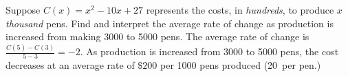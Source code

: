 {Suppose $C(x) = x^2-10x+27$ represents the costs, in \textit{hundreds}, to produce $x$ \textit{thousand} pens.  Find and interpret the average rate of change as production is increased from making 3000 to 5000 pens.}
{The average rate of change is $\frac{C(5)-C(3)}{5-3}=-2$.  As production is increased from 3000 to 5000 pens, the cost decreases at an average rate of  $\$200$ per 1000 pens produced (20\textcent \, per pen.)}